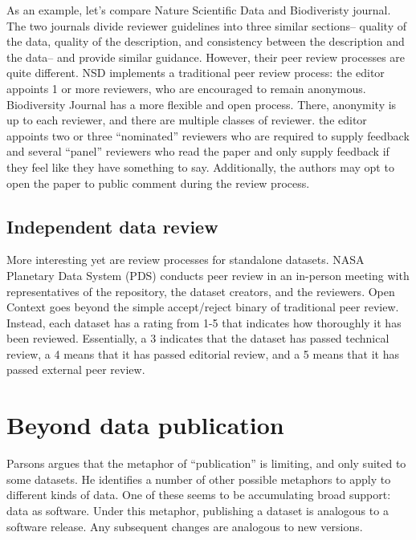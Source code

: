 \documentclass[10pt,a4paper,twocolumn]{article}
\begin{document}
As an example, let's compare Nature Scientific Data and Biodiveristy journal.
The two journals divide reviewer guidelines into three similar sections– quality of the data, quality of the description, and consistency between the description and the data– and provide similar guidance.
However, their peer review processes are quite different.
NSD implements a traditional peer review process: the editor appoints 1 or more reviewers, who are encouraged to remain anonymous.
Biodiversity Journal has a more flexible and open process.
There, anonymity is up to each reviewer, and there are multiple classes of reviewer.
the editor appoints two or three ``nominated'' reviewers who are required to supply feedback and several ``panel'' reviewers who read the paper and only supply feedback if they feel like they have something to say.
Additionally, the authors may opt to open the paper to public comment during the review process.


\subsection{Independent data review}
More interesting yet are review processes for standalone datasets. 
NASA Planetary Data System (PDS)\cite{nasa_pds} conducts peer review in an in-person meeting with representatives of the repository, the dataset creators, and the reviewers. 
Open Context goes beyond the simple accept/reject binary of traditional peer review. 
Instead, each dataset has a rating from 1-5 that indicates how thoroughly it has been reviewed. 
Essentially, a 3 indicates that the dataset has passed technical review, a 4 means that it has passed editorial review, and a 5 means that it has passed external peer review.


\section*{Beyond data publication}\label{beyond-data-publication}

Parsons\cite{parsons_is_2013} argues that the metaphor of ``publication'' is limiting, and only suited to some datasets. 
He identifies a number of other possible metaphors to apply to different kinds of data.
One of these seems to be accumulating broad support: data as software. 
Under this metaphor, publishing a dataset is analogous to a software release. 
Any subsequent changes are analogous to new versions.
\end{document}
